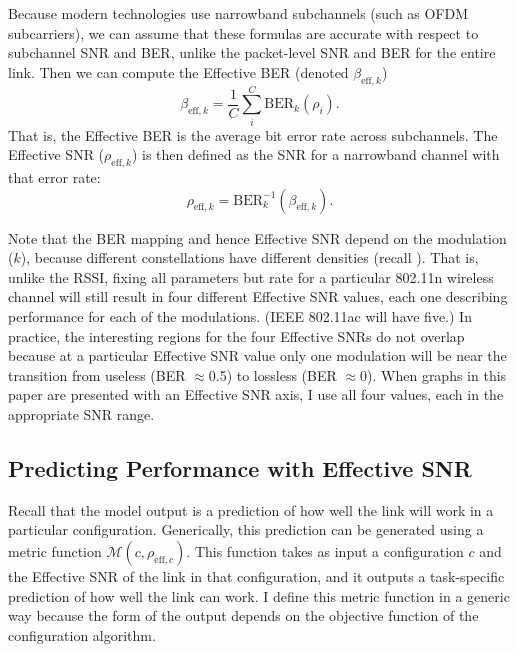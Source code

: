 Because modern technologies use narrowband subchannels (such as OFDM subcarriers), we can assume that these formulas are accurate with respect to subchannel SNR and BER, unlike the packet-level SNR and BER for the entire link. Then we can compute the Effective BER (denoted $\beta_{\text{eff},k}$)
\begin{equation}
	\label{eq:effective_ber}
	\beta_{\text{eff},k} = \frac{1}{C} \sum_{i}^{C} \text{BER}_k(\rho_i).
\end{equation}
That is, the Effective BER is the average bit error rate across subchannels. The Effective SNR ($\rho_{\text{eff},k}$) is then defined as the SNR for a narrowband channel with that error rate:
\begin{equation}
	\label{eq:effective_snr}
	\rho_{\text{eff},k} = \text{BER}_k^{-1}(\beta_{\text{eff},k}).
\end{equation}

Note that the BER mapping and hence Effective SNR depend on the modulation ($k$), because different constellations have different densities (recall ). That is, unlike the RSSI, fixing all parameters but rate for a particular 802.11n wireless channel will still result in four different Effective SNR values, each one describing performance for each of the modulations. (IEEE 802.11ac will have five.) In practice, the interesting regions for the four Effective SNRs do not overlap because at a particular Effective SNR value only one modulation will be near the transition from useless (BER $\approx$0.5) to lossless (BER $\approx$0). When graphs in this paper are presented with an Effective SNR axis, I use all four values, each in the appropriate SNR range.

\subsection{Predicting Performance with Effective SNR}
Recall that the model output is a prediction of how well the link will work in a particular configuration. Generically, this prediction can be generated using a metric function $\mathcal{M}(c, \rho_{\text{eff},c})$. This function takes as input a configuration $c$ and the Effective SNR of the link in that configuration, and it outputs a task-specific prediction of how well the link can work. I define this metric function in a generic way because the form of the output depends on the objective function of the configuration algorithm.

